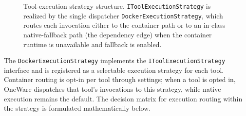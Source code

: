 \begin{figure}[H]
    \centering
    \caption[Strategy Pattern for Tool Execution]{Tool-execution strategy structure. \texttt{IToolExecutionStrategy} is realized by the single dispatcher \texttt{DockerExecutionStrategy}, which routes each invocation either to the container path or to an in-class native-fallback path (the dependency edge) when the container runtime is unavailable and fallback is enabled.}
    \label{fig:strategy_pattern}
\end{figure}

The \texttt{DockerExecutionStrategy} implements the \texttt{IToolExecutionStrategy} interface and is registered as a selectable execution strategy for each tool. Container routing is opt-in per tool through settings; when a tool is opted in, OneWare dispatches that tool's invocations to this strategy, while native execution remains the default. The decision matrix for execution routing within the strategy is formulated mathematically below.

